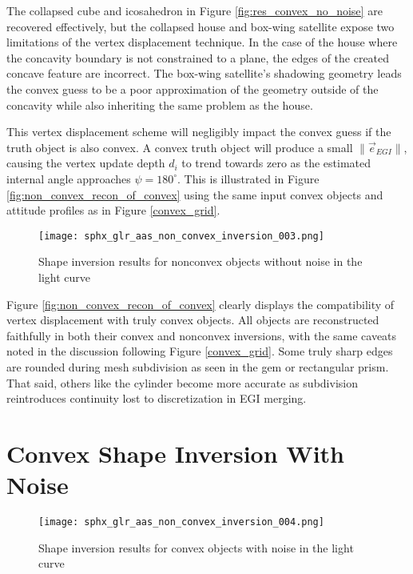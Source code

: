 The collapsed cube and icosahedron in Figure \ref{fig:res_convex_no_noise} are recovered effectively, but the collapsed house and box-wing satellite expose two limitations of the vertex displacement technique. In the case of the house where the concavity boundary is not constrained to a plane, the edges of the created concave feature are incorrect. The box-wing satellite's shadowing geometry leads the convex guess to be a poor approximation of the geometry outside of the concavity while also inheriting the same problem as the house.

This vertex displacement scheme will negligibly impact the convex guess if the truth object is also convex. A convex truth object will produce a small $\|\vec{e}_{EGI}\|$, causing the vertex update depth $d_{i}$ to trend towards zero as the estimated internal angle approaches $\psi = 180^\circ$. This is illustrated in Figure \ref{fig:non_convex_recon_of_convex} using the same input convex objects and attitude profiles as in Figure \ref{convex_grid}.


\begin{figure}[!htb]
  \centering
  \texttt{[image: sphx\_glr\_aas\_non\_convex\_inversion\_003.png]}
  \caption{Shape inversion results for nonconvex objects without noise in the light curve}
  \label{fig:res_nonconvex_no_noise}
\end{figure}

Figure \ref{fig:non_convex_recon_of_convex} clearly displays the compatibility of vertex displacement with truly convex objects. All objects are reconstructed faithfully in both their convex and nonconvex inversions, with the same caveats noted in the discussion following Figure \ref{convex_grid}. Some truly sharp edges are rounded during mesh subdivision as seen in the gem or rectangular prism. That said, others like the cylinder become more accurate as subdivision reintroduces continuity lost to discretization in EGI merging.

\clearpage
\section{Convex Shape Inversion With Noise}

\begin{figure}[!htb]
  \centering
  \texttt{[image: sphx\_glr\_aas\_non\_convex\_inversion\_004.png]}
  \caption{Shape inversion results for convex objects with noise in the light curve}
  \label{fig:res_convex_with_noise}
\end{figure}

